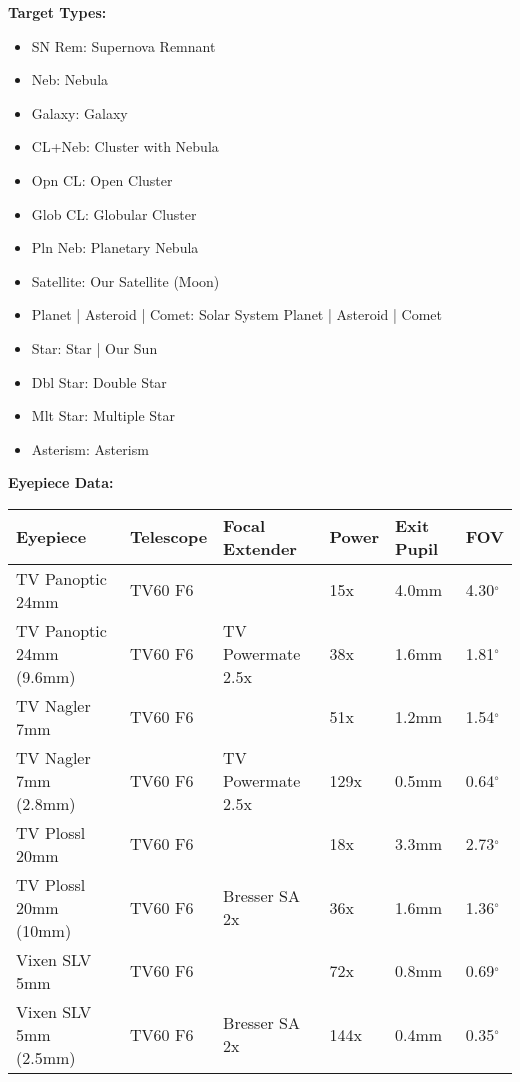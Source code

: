\bigskip
{\bf Target Types:}
\begin{itemize}
\renewcommand\labelitemi{--}
\item SN Rem: Supernova Remnant
\item Neb: Nebula
\item Galaxy: Galaxy
\item CL+Neb: Cluster with Nebula
\item Opn CL: Open Cluster
\item Glob CL: Globular Cluster
\item Pln Neb: Planetary Nebula
\item Satellite: Our Satellite (Moon)
\item Planet | Asteroid | Comet: Solar System Planet | Asteroid | Comet
\item Star: Star | Our Sun
\item Dbl Star: Double Star
\item Mlt Star: Multiple Star
\item Asterism: Asterism
\end{itemize}


\newpage
{\bf Eyepiece Data:}
\begin{longtable}{@{}llllll@{}}
\hline
{\bf Eyepiece} & {\bf Telescope} & {\bf Focal Extender} & {\bf Power} & {\bf Exit Pupil} & {\bf FOV}\\
\hline
TV Panoptic 24mm & TV60 F6 & & 15x & 4.0mm & 4.30$^{\circ}$ \\
TV Panoptic 24mm (9.6mm)& TV60 F6 & TV Powermate 2.5x & 38x & 1.6mm & 1.81$^{\circ}$ \\
TV Nagler 7mm & TV60 F6 & & 51x & 1.2mm & 1.54$^{\circ}$ \\
TV Nagler 7mm (2.8mm)& TV60 F6 & TV Powermate 2.5x & 129x & 0.5mm & 0.64$^{\circ}$ \\
\hline
TV Plossl 20mm & TV60 F6 & & 18x & 3.3mm & 2.73$^{\circ}$ \\
TV Plossl 20mm (10mm) & TV60 F6 & Bresser SA 2x & 36x & 1.6mm & 1.36$^{\circ}$ \\
Vixen SLV 5mm & TV60 F6 & & 72x & 0.8mm & 0.69$^{\circ}$ \\
Vixen SLV 5mm (2.5mm) & TV60 F6 & Bresser SA 2x & 144x & 0.4mm & 0.35$^{\circ}$ \\
\hline
\end{longtable}
